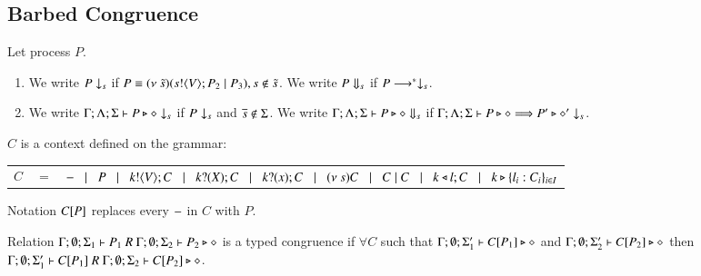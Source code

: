 \subsection{Barbed Congruence}

\begin{definition}[Barbs]
	Let process $P$.
	\begin{enumerate}

		\item	We write $P \downarrow_{s}$ if $P \equiv (\nu\ \tilde{s})(s ! \langle V \rangle ; P_2 \;|\; P_3), s \notin \tilde{s}$.
			We write $P \Downarrow_{s}$ if $P \longrightarrow^* \downarrow_{s}$.

		\item	We write $\Gamma; \Lambda; \Sigma \vdash P \triangleright \diamond \downarrow_{s}$ if $P \downarrow_{s}$ and $\overline{s} \notin \Sigma$.
			We write $\Gamma; \Lambda; \Sigma \vdash P \triangleright \diamond \Downarrow_{s}$ if $\Gamma; \Lambda; \Sigma \vdash P \triangleright \diamond \stackrel{}{\Longrightarrow} P' \triangleright \diamond' \downarrow_{s}$.			
	\end{enumerate}
\end{definition}

\begin{definition}[Context]
	$C$ is a context defined on the grammar:

	\begin{tabular}{rcl}
		$C$ &$=$& $- \;\;\;|\;\;\; P \;\;\;|\;\;\; k ! \langle V \rangle ; C \;\;\;|\;\;\; k ? (X) ; C \;\;\;|\;\;\; k ? (x) ; C \;\;\;|\;\;\; (\nu\ s) C \;\;\;|\;\;\; C \;|\; C \;\;\;|\;\;\; k \triangleleft l ; C \;\;\;|\;\;\; k \triangleright \{l_i:C_i\}_{i \in I}$
	\end{tabular}
	Notation $C[P]$ replaces every $-$ in $C$ with $P$.
\end{definition}

\begin{definition}
	Relation $\Gamma;\emptyset;\Sigma_1 \vdash P_1\ R\ \Gamma; \emptyset; \Sigma_2 \vdash P_2 \triangleright \diamond$
	is a typed congruence if
	$\forall C$ such that $\Gamma;\emptyset;\Sigma_1' \vdash C[P_1] \triangleright \diamond$ and
	$\Gamma;\emptyset;\Sigma_2' \vdash C[P_2] \triangleright \diamond$ then
	$\Gamma;\emptyset;\Sigma_1' \vdash C[P_1]\ R\ \Gamma; \emptyset; \Sigma_2 \vdash C[P_2] \triangleright \diamond$.
\end{definition}

